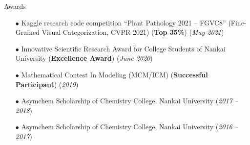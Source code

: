 \begin{rSection}{Awards}

    \begin{itemize}[leftmargin=*]
        \item[$\bullet$] Kaggle research code competition ``Plant Pathology 2021 -- FGVC8'' (Fine-Grained Visual Categorization, CVPR 2021) (\textbf{Top 35\%}) (\textit{May 2021})
        \item[$\bullet$] Innovative Scientific Research Award for College Students of Nankai University (\textbf{Excellence Award}) (\textit{June 2020})
        \item[$\bullet$] Mathematical Contest In Modeling (MCM/ICM) (\textbf{Successful Participant}) (\textit{2019})
        \item[$\bullet$] Asymchem Scholarship of Chemistry College, Nankai University (\textit{2017 -- 2018})
        \item[$\bullet$] Asymchem Scholarship of Chemistry College, Nankai University (\textit{2016 -- 2017})
    \end{itemize}
    
\end{rSection}